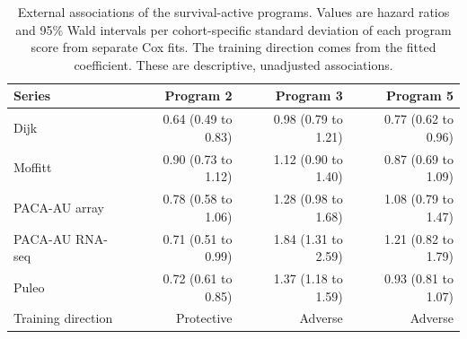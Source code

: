 \begin{table}[!htb]
\centering
\caption{External associations of the survival-active programs. Values are hazard ratios and 95\% Wald intervals per cohort-specific standard deviation of each program score from separate Cox fits. The training direction comes from the fitted coefficient. These are descriptive, unadjusted associations.}
\label{tab:external-program-direction}
\begin{tabular}{lrrr}
\toprule
Series & Program 2 & Program 3 & Program 5 \\
\midrule
Dijk & 0.64 (0.49 to 0.83) & 0.98 (0.79 to 1.21) & 0.77 (0.62 to 0.96) \\
Moffitt & 0.90 (0.73 to 1.12) & 1.12 (0.90 to 1.40) & 0.87 (0.69 to 1.09) \\
PACA-AU array & 0.78 (0.58 to 1.06) & 1.28 (0.98 to 1.68) & 1.08 (0.79 to 1.47) \\
PACA-AU RNA-seq & 0.71 (0.51 to 0.99) & 1.84 (1.31 to 2.59) & 1.21 (0.82 to 1.79) \\
Puleo & 0.72 (0.61 to 0.85) & 1.37 (1.18 to 1.59) & 0.93 (0.81 to 1.07) \\
\midrule
Training direction & Protective & Adverse & Adverse \\
\bottomrule
\end{tabular}
\end{table}
